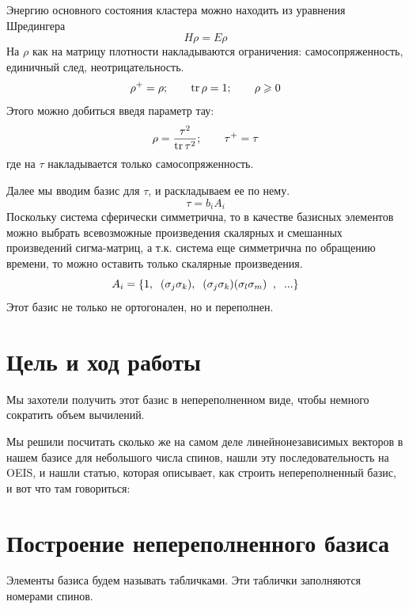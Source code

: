 \documentclass[]{article}
\begin{document}
Энергию основного состояния кластера можно находить из уравнения Шредингера 
$$H \rho = E \rho$$
На $\rho$ как на матрицу плотности накладываются ограничения: самосопряженность, единичный след, неотрицательность.
$${\rho ^ + } = \rho ;\qquad \mathop{\rm{tr}}\rho  = 1;\qquad  \rho  \geqslant 0$$
Этого можно добиться введя параметр тау: 
$$\rho  = \frac{{{\tau ^2}}}{{\mathop{\rm{tr}}{\tau ^2}}};\qquad {\tau ^ + } = \tau $$
где на $\tau$ накладывается только самосопряженность.

Далее мы вводим базис для $\tau$, и раскладываем ее по нему.
$$\tau=b_i A_i$$
Поскольку система сферически симметрична, то в качестве базисных элементов можно выбрать всевозможные произведения 
скалярных и смешанных произведений сигма-матриц, а т.к. система еще симметрична по обращению времени, то можно оставить только скалярные произведения.
$$A_i=\{ 1,  \;\;({\bf \sigma}_j{\bf\sigma}_k), \;\;
({\bf \sigma}_j{\bf\sigma}_k)({\bf \sigma}_l{\bf\sigma}_m)\;\;,\;\;...\}$$
Этот базис не только не ортогонален, но и переполнен.

\section{Цель и ход работы}
Мы захотели получить этот базис в непереполненном виде, чтобы немного сократить объем вычилений.


Мы решили посчитать сколько же на самом деле линейнонезависимых векторов в нашем базисе для небольшого числа спинов,
нашли эту последовательность на OEIS, 
и нашли статью, которая описывает, как строить непереполненный базис, и вот что там говориться:

\section{Построение непереполненного базиса \cite{source_article}}
Элементы базиса будем называть табличками. Эти таблички заполняются номерами спинов.
\end{document}
